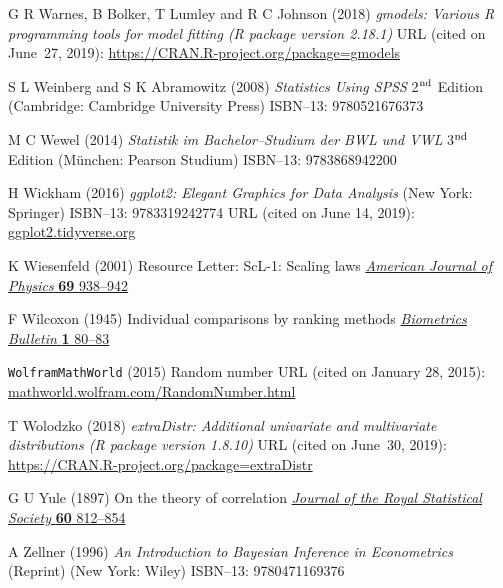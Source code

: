 \begin{thebibliography}{99}
G R Warnes, B Bolker, T Lumley and R C Johnson
(2018) \textit{gmodels: Various R programming tools for model
fitting (R package version 2.18.1)} URL (cited on June~27, 2019): 
\href{https://CRAN.R-project.org/package=gmodels}{https://CRAN.R-project.org/package=gmodels}

S L Weinberg and S K Abramowitz
(2008) \textit{Statistics Using SPSS}
2$^{\rm nd}$ Edition (Cambridge: Cambridge University Press) 
ISBN--13: 9780521676373

M C Wewel
(2014) \textit{Statistik im Bachelor--Studium der BWL und VWL}
3$^{\rm nd}$ Edition (M\"unchen: Pearson Studium)
ISBN--13: 9783868942200

H Wickham
(2016) \textit{ggplot2: Elegant Graphics for Data Analysis}
(New York: Springer)
ISBN--13: 9783319242774
URL (cited on June 14, 2019): \href{https://ggplot2.tidyverse.org}{ggplot2.tidyverse.org}

K Wiesenfeld
(2001) Resource Letter: ScL-1: Scaling laws
\href{http://dx.doi.org/10.1119/1.1383601}{\textit{American Journal 
of Physics}
\textbf{69} 938--942}

F Wilcoxon
(1945) Individual comparisons by ranking methods
\href{http://www.jstor.org/stable/3001968}{\textit{Biometrics
Bulletin} \textbf{1} 80--83}

{\tt WolframMathWorld} (2015)
Random number
URL (cited on January 28, 2015):
\href{http://mathworld.wolfram.com/RandomNumber.html}{mathworld.wolfram.com/RandomNumber.html}

T Wolodzko
(2018) \textit{extraDistr: Additional univariate and multivariate
distributions (R package version 1.8.10)}
URL (cited on June~30, 2019): 
\href{https://CRAN.R-project.org/package=extraDistr}{https://CRAN.R-project.org/package=extraDistr}

G U Yule
(1897) On the theory of correlation
\href{http://dx.doi.org/10.2307/2979746}{\textit{Journal of the 
Royal Statistical Society} \textbf{60} 812--854}

A Zellner
(1996) \textit{An Introduction to Bayesian Inference in 
Econometrics} (Reprint) (New York: Wiley)
ISBN--13: 9780471169376

\end{thebibliography}
